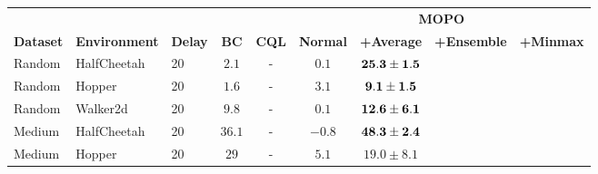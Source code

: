 \begin{table}[h]
    \centering
    \begin{tabular}{lll|cc|cccc}
        \toprule
                                        &                                     &                                &                            &                              & \multicolumn{4}{c}{\bf MOPO}                                                                                                             \\
        \multicolumn{1}{l}{\bf Dataset} & \multicolumn{1}{c}{\bf Environment} & \multicolumn{1}{c|}{\bf Delay} & \multicolumn{1}{c}{\bf BC} & \multicolumn{1}{c|}{\bf CQL} & \multicolumn{1}{c}{\bf{Normal}} & \multicolumn{1}{c}{\bf +Average} & \multicolumn{1}{c}{\bf +Ensemble} & \multicolumn{1}{c}{\bf +Minmax} \\
        \midrule
        Random                          & HalfCheetah                         & 20                             & $2.1$                      & -                            & $0.1$                           & $\bf{25.3 \pm 1.5 }$                                                                                   \\
        Random                          & Hopper                              & 20                             & $1.6$                      & -                            & $3.1$                           & $\bf{9.1 \pm 1.5 }$                                                                                    \\
        Random                          & Walker2d                            & 20                             & $9.8$                      & -                            & $0.1$                           & $\bf{12.6 \pm 6.1 }$                                                                                   \\
        \midrule
        Medium                          & HalfCheetah                         & 20                             & $36.1$                     & -                            & $-0.8$                          & $\bf{48.3 \pm 2.4}$                                                                                    \\
        Medium                          & Hopper                              & 20                             & $29$                       & -                            & $5.1$                           & $19.0 \pm 8.1$                                                                                         \\

\end{tabular}
\end{table}
